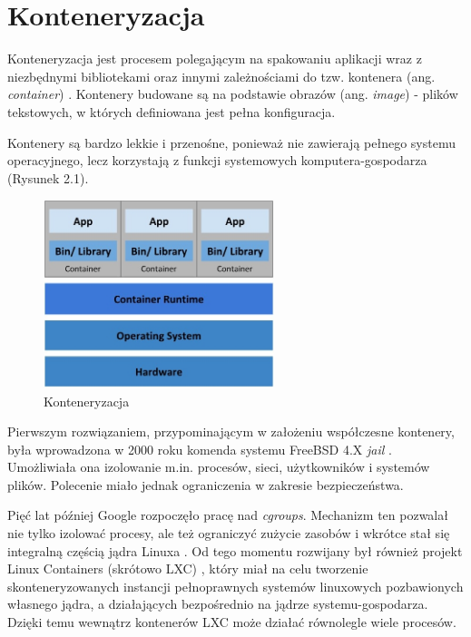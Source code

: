 

\chapter{Konteneryzacja}

Konteneryzacja jest procesem polegającym na spakowaniu aplikacji wraz z niezbędnymi bibliotekami oraz innymi zależnościami do tzw. kontenera (ang. \textit{container}) \cite{biblia_linux}. Kontenery budowane są na podstawie obrazów (ang. \textit{image}) - plików tekstowych, w których definiowana jest pełna konfiguracja.

Kontenery są bardzo lekkie i przenośne, ponieważ nie zawierają pełnego systemu operacyjnego, lecz korzystają z funkcji systemowych komputera-gospodarza (Rysunek 2.1). 

\begin{figure}[h]
    \centering
    \includegraphics[width=0.6\textwidth]{img/rozdzial1-2.jpg}
    \caption{Konteneryzacja \cite{kubernetes}}
\end{figure}

Pierwszym rozwiązaniem, przypominającym w założeniu współczesne kontenery, była wprowadzona w 2000 roku komenda systemu FreeBSD 4.X \textit{jail} \cite{freebsd, nickoloff}. Umożliwiała ona izolowanie m.in. procesów, sieci, użytkowników i systemów plików. Polecenie miało jednak ograniczenia w zakresie bezpieczeństwa. 

Pięć lat później Google rozpoczęło pracę nad \textit{cgroups}. Mechanizm ten pozwalał nie tylko izolować procesy, ale też ograniczyć zużycie zasobów i wkrótce stał się integralną częścią jądra Linuxa \cite{nickoloff}. 
Od tego momentu rozwijany był również projekt Linux Containers (skrótowo LXC) \cite{lxc}, który miał na celu tworzenie skonteneryzowanych instancji pełnoprawnych systemów linuxowych pozbawionych własnego jądra, a działających bezpośrednio na jądrze systemu-gospodarza. Dzięki temu wewnątrz kontenerów LXC może działać równolegle wiele procesów.

